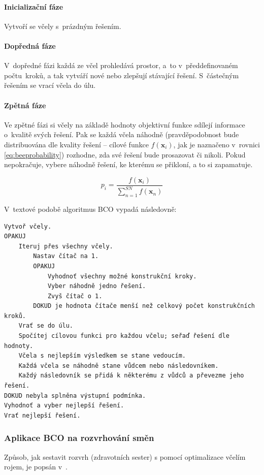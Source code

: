 \documentclass[twoside]{ctuthesis}
\begin{document}
\paragraph{Inicializační fáze} Vytvoří se včely s~prázdným řešením.

\paragraph{Dopředná fáze} V~dopředné fázi každá ze včel prohledává prostor, a~to v~předdefinovaném počtu~kroků, a tak vytváří nové nebo zlepšují stávající řešení. S~částečným řešením se vrací včela do úlu.

\paragraph{Zpětná fáze} Ve zpětné fázi si včely na základě hodnoty objektivní funkce sdílejí informace o~kvalitě svých řešení. Pak se každá včela náhodně (prav\-dě\-po\-dob\-nost bude distribuována dle kvality řešení -- cílové funkce $f(\boldsymbol{x}_i)$, jak je naznačeno v~rovnici \ref{eq:beeprobability}) rozhodne, zda své řešení bude prosazovat či nikoli. Pokud nepokračuje, vybere náhodně řešení, ke kterému se přikloní, a to si zapamatuje. \cite{teodorovic2009bee}

\begin{equation}
	\label{eq:beeprobability}
	p_i = \frac{f(\boldsymbol{x}_i)}{\sum_{n = 1}^{SN} f(\boldsymbol{x}_n)}
\end{equation}

V~textové podobě algoritmus BCO vypadá následovně:
\begin{lstlisting}[caption={Pseudokód pro BCO}]
Vytvoř včely.
OPAKUJ
	Iteruj přes všechny včely.
		Nastav čítač na 1.
		OPAKUJ
			Vyhodnoť všechny možné konstrukční kroky.
			Vyber náhodně jedno řešení.
			Zvyš čítač o 1.
		DOKUD je hodnota čítače menší než celkový počet konstrukčních kroků.
	Vrať se do úlu.
	Spočítej cílovou funkci pro každou včelu; seřaď řešení dle hodnoty.
	Včela s nejlepším výsledkem se stane vedoucím.
	Každá včela se náhodně stane vůdcem nebo následovníkem.
	Každý následovník se přidá k některému z vůdců a převezme jeho řešení.
DOKUD nebyla splněna výstupní podmínka.
Vyhodnoť a vyber nejlepší řešení.
Vrať nejlepší řešení.
\end{lstlisting}

\subsubsection{Aplikace BCO na rozvrhování směn}
\label{sub:bconrp}
Způsob, jak sestavit rozvrh (zdravotních sester) s pomocí optimalizace včelím rojem, je popsán v~\cite{todorovic2012bee}.
\end{document}
